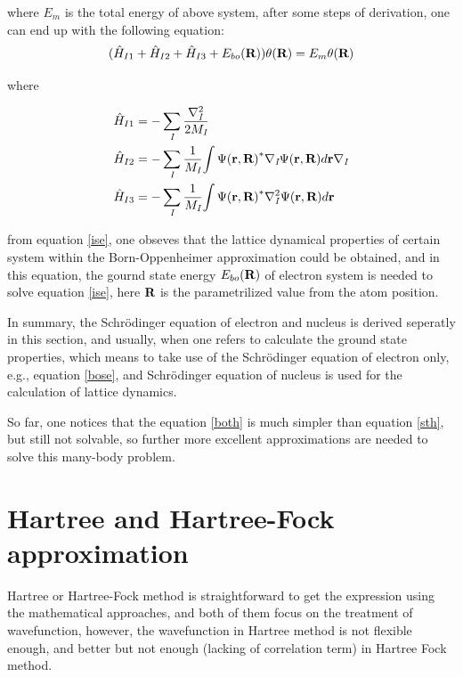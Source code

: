 \documentclass[a4paper, 12pt, titlepage,oneside,drop]{kthesis}
\begin{document}
\noindent where $E_{m}$ is the total energy of above system, after some steps of derivation, one can end up with the following equation:
\begin{equation}\label{ise}
( \hat{H}_{I1}+\hat{H}_{I2}+\hat{H}_{I3}+E_{bo}({\textbf R}) ) {\theta(\textbf{R})} = {E_m} {\theta(\textbf{R})}
\end{equation}

\noindent where

\begin{equation}\begin{split}
 &  \hat{H}_{I1} = - \sumi<I> \frac{{{\nabla}_{\textit{I}}^{2}}}{2 M_\textit{I}}   \\
 &  \hat{H}_{I2} = - \sumi<I> \frac{1}{M_\textit{I}} {\int {\Psi(\textbf{r}, \textbf{R})}^{\ast} {{\nabla}_{\textit{I}}} {\Psi(\textbf{r}, \textbf{R})} d {\textbf r }} {{\nabla}_{\textit{I}}} \\
 &  \hat{H}_{I3} = - \sumi<I> \frac{1}{M_\textit{I}} {\int {\Psi(\textbf{r}, \textbf{R})}^{\ast} {{\nabla}_{\textit{I}}^{2}} {\Psi(\textbf{r}, \textbf{R})} d {\textbf r }} 
\end{split}\end{equation}

\noindent from equation \ref{ise}, one obseves that the lattice dynamical properties of certain system within the Born-Oppenheimer approximation could be obtained, and in this equation,
the gournd state energy $E_{bo}({\textbf R})$ of electron system is needed to solve equation \ref{ise}, here $\textbf R$ is the parametrilized value from the atom position.
 

\noindent In summary, the Schrödinger equation of electron and nucleus is derived seperatly in this section, and usually, when one refers to calculate the ground state properties,
which means to take use of the Schrödinger equation of electron only, e.g., equation \ref{bose}, and Schrödinger equation of nucleus is used for the calculation of lattice dynamics.

So far, one notices that the equation \ref{both} is much simpler than equation \ref{sth}, but still not solvable, so further more excellent approximations  are needed
to solve this many-body problem.


\section{Hartree and Hartree-Fock approximation}
\noindent Hartree or Hartree-Fock method is straightforward to get the 
expression using the mathematical approaches, and both of them focus on the treatment of wavefunction, however, the wavefunction in Hartree method is not 
flexible enough, and better but not enough (lacking of correlation term) in Hartree Fock method.
\end{document}
